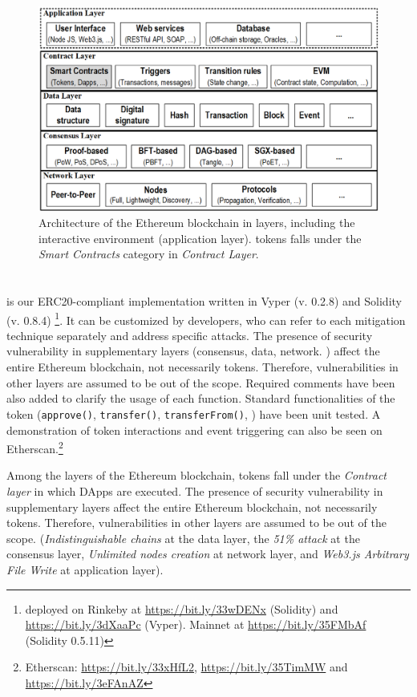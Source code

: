 
\begin{figure}[t!]
	\centering
	\includegraphics[width=1.0\linewidth]{figures/blockchain.png}
	\caption{Architecture of the Ethereum blockchain in layers, including the interactive environment (\ie application layer). \erc tokens falls under the \textit{Smart Contracts} category in \textit{Contract Layer}.}\label{fig:blockchain}
\end{figure}

\section{\sys}\label{sec:proposal}
\sys is our ERC20-compliant implementation written in Vyper (v. 0.2.8) and Solidity (v. 0.8.4) \footnote{\sys deployed on Rinkeby at \url{https://bit.ly/33wDENx} (Solidity) and \url{https://bit.ly/3dXaaPc} (Vyper). Mainnet at \url{https://bit.ly/35FMbAf} (Solidity 0.5.11)}. It can be customized by developers, who can refer to each mitigation technique separately and address specific attacks. The presence of security vulnerability in supplementary layers (\ie consensus, data, network. \etc) affect the entire Ethereum blockchain, not necessarily \erc tokens. Therefore, vulnerabilities in other layers are assumed to be out of the scope. Required comments have been also added to clarify the usage of each function. Standard functionalities of the token (\ie \texttt{approve()}, \texttt{transfer()}, \texttt{transferFrom()}, \etc) have been unit tested. A demonstration of token interactions and event triggering can also be seen on Etherscan.\footnote{Etherscan: \url{https://bit.ly/33xHfL2}, \url{https://bit.ly/35TimMW} and \url{https://bit.ly/3eFAnAZ}} 

Among the layers of the Ethereum blockchain, \erc tokens fall under the \textit{Contract layer} in which DApps are executed. The presence of security vulnerability in supplementary layers affect the entire Ethereum blockchain, not necessarily \erc tokens. Therefore, vulnerabilities in other layers are assumed to be out of the scope. (\eg \textit{Indistinguishable chains} at the data layer, the \textit{51\% attack} at the consensus layer, \textit{Unlimited nodes creation} at network layer, and \textit{Web3.js Arbitrary File Write} at application layer). 

